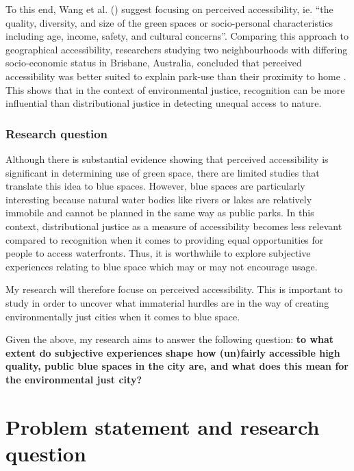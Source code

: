 \documentclass{article}
\begin{document}
To this end, Wang et al. (\citeyear{wang2015physical}) suggest focusing on perceived accessibility, ie. ``the quality, diversity, and size of the green spaces or socio-personal characteristics including age, income, safety, and cultural concerns''. Comparing this approach to geographical accessibility, researchers studying two neighbourhoods with differing socio-economic status in Brisbane, Australia, concluded that perceived accessibility was better suited to explain park-use than their proximity to home \parencite{wang2015comparison}.
This shows that in the context of environmental justice, recognition can be more influential than distributional justice in detecting unequal access to nature. 

\subsubsection{Research question}

Although there is substantial evidence showing that perceived accessibility is significant in determining use of green space, there are limited studies that translate this idea to blue spaces.
However, blue spaces are particularly interesting because natural water bodies like rivers or lakes are relatively immobile and cannot be planned in the same way as public parks. 
In this context, distributional justice as a measure of accessibility becomes less relevant compared to recognition when it comes to providing equal opportunities for people to access waterfronts. Thus, it is worthwhile to explore subjective experiences relating to blue space which may or may not encourage usage.


My research will therefore focuse on perceived accessibility. This is important to study in order to uncover what immaterial hurdles are in the way of creating environmentally just cities when it comes to blue space.

Given the above, my research aims to answer the following question: \textbf{to what extent do subjective experiences shape how (un)fairly accessible high quality, public blue spaces in the city are, and what does this mean for the environmental just city?}

\pagebreak
\section{Problem statement and research question}
\end{document}
